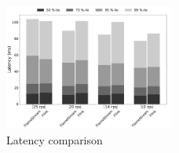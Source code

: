 \begin{figure}[htbp]
  \centering
  \includegraphics[width=0.5\textwidth]{pics/comp-index-quantiles}
  \caption{Latency comparison}
  \label {fs-index-quantiles}
\end{figure}
